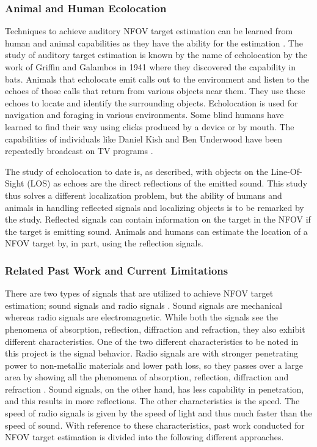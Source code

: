 \documentclass[letterpaper, 10 pt, conference]{ieeeconf}  %
\begin{document}
{\selectfont
\subsubsection{\sc Animal and Human Ecolocation}}
\vspace*{-0.09in}
\noindent Techniques to achieve auditory NFOV target estimation can be learned from human and animal capabilities as they have the ability for the estimation \cite{valin2005auditory}.  The study of auditory target estimation is known by the name of echolocation by the work of Griffin and Galambos in 1941 \cite{griffin1941sensory} where they discovered the capability in bats.  Animals that echolocate emit calls out to the environment and listen to the echoes of those calls that return from various objects near them.  They use these echoes to locate and identify the surrounding objects. Echolocation is used for navigation and foraging in various environments. Some blind humans have learned to find their way using clicks produced by a device or by mouth.  The capabilities of individuals like Daniel Kish and Ben Underwood have been repeatedly broadcast on TV programs \cite{ben2006TV,kish2012}.  

The study of echolocation to date is, as described, with objects on the Line-Of-Sight (LOS) as echoes are the direct reflections of the emitted sound.  This study thus solves a different localization problem, but the ability of humans and animals in handling reflected signals and localizing objects is to be remarked by the study.  Reflected signals can contain information on the target in the NFOV if the target is emitting sound.  Animals and humans can estimate the location of a NFOV target by, in part, using the reflection signals.  

{\selectfont
\subsubsection{\sc Related Past Work and Current Limitations}}
\vspace*{-0.09in}
\noindent There are two types of signals that are utilized to achieve NFOV target estimation; sound signals \cite{hofman1998relearning,sva12} and radio signals \cite{bellusci2007ultra}.  Sound signals are mechanical whereas radio signals are electromagnetic.  While both the signals see the phenomena of absorption, reflection, diffraction and refraction, they also exhibit different characteristics.  One of the two different characteristics to be noted in this project is the signal behavior.  Radio signals are with stronger penetrating power to non-metallic materials and lower path loss, so they passes over a large area by showing all the phenomena of absorption, reflection, diffraction and refraction \cite{gezici2005localization,sayed2005network,storer1994shortest}.  Sound signals, on the other hand, has less capability in penetration, and this results in more reflections.  The other characteristics is the speed.  The speed of radio signals is given by the speed of light and thus much faster than the speed of sound.  With reference to these characteristics, past work conducted for NFOV target estimation is divided into the following different approaches.  
\end{document}

